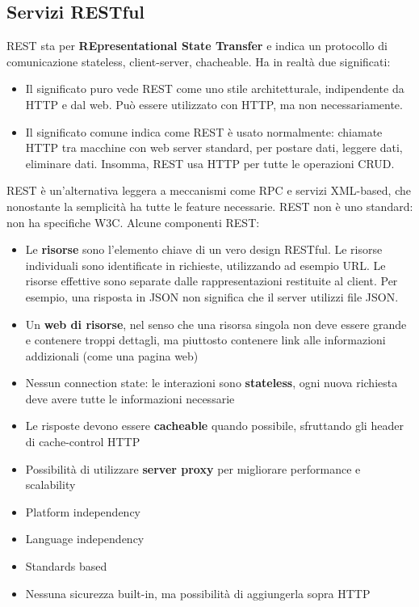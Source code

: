 \documentclass[11pt]{article}
\begin{document}
\subsection{Servizi RESTful}
REST sta per \textbf{REpresentational State Transfer} e indica un protocollo di comunicazione stateless, client-server, chacheable. Ha in realtà due significati:
\begin{itemize}
    \item Il significato puro vede REST come uno stile architetturale, indipendente da HTTP e dal web. Può essere utilizzato con HTTP, ma non necessariamente.
    \item Il significato comune indica come REST è usato normalmente: chiamate HTTP tra macchine con web server standard, per postare dati, leggere dati, eliminare dati. Insomma, REST usa HTTP per tutte le operazioni CRUD.
\end{itemize}
REST è un'alternativa leggera a meccanismi come RPC e servizi XML-based, che nonostante la semplicità ha tutte le feature necessarie. REST non è uno standard: non ha specifiche W3C. 
Alcune componenti REST:
\begin{itemize}
    \item Le \textbf{risorse} sono l'elemento chiave di un vero design RESTful. Le risorse individuali sono identificate in richieste, utilizzando ad esempio URL. Le risorse effettive sono separate dalle rappresentazioni restituite al client. Per esempio, una risposta in JSON non significa che il server utilizzi file JSON. 
    \item Un \textbf{web di risorse}, nel senso che una risorsa singola non deve essere grande e contenere troppi dettagli, ma piuttosto contenere link alle informazioni addizionali (come una pagina web)
    \item Nessun connection state: le interazioni sono \textbf{stateless}, ogni nuova richiesta deve avere tutte le informazioni necessarie 
    \item Le risposte devono essere \textbf{cacheable} quando possibile, sfruttando gli header di cache-control HTTP
    \item Possibilità di utilizzare \textbf{server proxy} per migliorare performance e scalability
    \item Platform independency
    \item Language independency
    \item Standards based
    \item Nessuna sicurezza built-in, ma possibilità di aggiungerla sopra HTTP 
\end{itemize}
\end{document}
